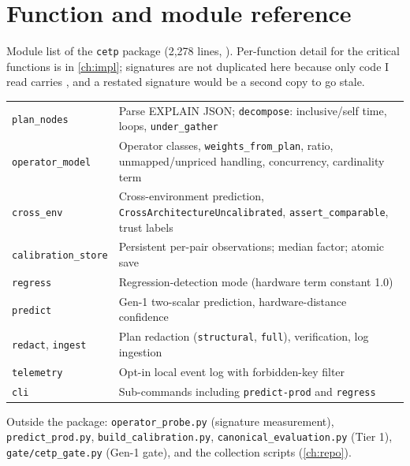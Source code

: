 \chapter{Function and module reference}\label{app:reference}
Module list of the \texttt{cetp} package (2{,}278 lines, \evCODE). Per-function detail for the critical functions is in \cref{ch:impl}; signatures are not duplicated here because only code I read carries \evCODE, and a restated signature would be a second copy to go stale.
\begin{center}\small
\begin{tabularx}{\textwidth}{@{}L{3.2cm}Y@{}}
\toprule {} & \\ \midrule
\texttt{plan\_nodes} & Parse EXPLAIN JSON; \texttt{decompose}: inclusive/self time, loops, \texttt{under\_gather}\\
\texttt{operator\_model} & Operator classes, \texttt{weights\_from\_plan}, ratio, unmapped/unpriced handling, concurrency, cardinality term\\
\texttt{cross\_env} & Cross-environment prediction, \texttt{CrossArchitectureUncalibrated}, \texttt{assert\_comparable}, trust labels\\
\texttt{calibration\_store} & Persistent per-pair observations; median factor; atomic save\\
\texttt{regress} & Regression-detection mode (hardware term constant 1.0)\\
\texttt{predict} & Gen-1 two-scalar prediction, hardware-distance confidence\\
\texttt{redact}, \texttt{ingest} & Plan redaction (\texttt{structural}, \texttt{full}), verification, log ingestion\\
\texttt{telemetry} & Opt-in local event log with forbidden-key filter\\
\texttt{cli} & Sub-commands including \texttt{predict-prod} and \texttt{regress}\\
\bottomrule
\end{tabularx}
\end{center}
Outside the package: \texttt{operator\_probe.py} (signature measurement), \texttt{predict\_prod.py}, \texttt{build\_calibration.py}, \texttt{canonical\_evaluation.py} (Tier 1), \texttt{gate/cetp\_gate.py} (Gen-1 gate), and the collection scripts (\cref{ch:repo}).
